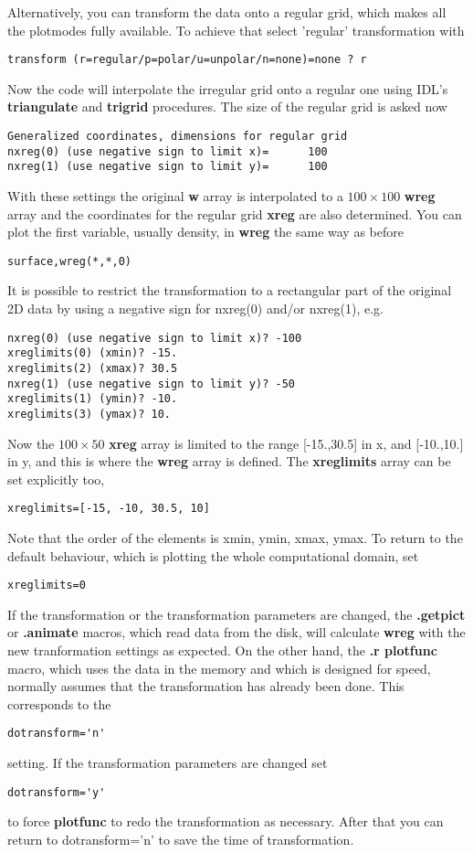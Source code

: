    Alternatively, you can transform the data onto a regular grid, 
   which makes all the plotmodes fully available. 
   To achieve that select 'regular' transformation with
\begin{verbatim}
transform (r=regular/p=polar/u=unpolar/n=none)=none ? r
\end{verbatim}
   Now the code will interpolate the irregular grid onto a 
   regular one using IDL's {\bf triangulate} and {\bf trigrid} procedures.  
   The size of the regular grid is asked now
\begin{verbatim}
Generalized coordinates, dimensions for regular grid
nxreg(0) (use negative sign to limit x)=      100
nxreg(1) (use negative sign to limit y)=      100
\end{verbatim}
   With these settings the original {\bf w} array is interpolated to 
   a $100\times100$ {\bf wreg} array and the
   coordinates for the regular grid {\bf xreg} are also determined. 
   You can plot the first variable, usually density, in {\bf wreg} the 
   same way as before
\begin{verbatim}
surface,wreg(*,*,0)
\end{verbatim}
   It is possible to restrict the transformation to a rectangular
   part of the original 2D data by using a negative sign for nxreg(0) and/or
   nxreg(1), e.g.
\begin{verbatim}
nxreg(0) (use negative sign to limit x)? -100
xreglimits(0) (xmin)? -15.
xreglimits(2) (xmax)? 30.5
nxreg(1) (use negative sign to limit y)? -50
xreglimits(1) (ymin)? -10.
xreglimits(3) (ymax)? 10.
\end{verbatim}
   Now the $100\times 50$ {\bf xreg} array is limited to the range 
   [-15.,30.5] in x, and [-10.,10.] in y, and this is where the {\bf wreg} 
   array is defined. The {\bf xreglimits} array can be set explicitly too,
\begin{verbatim}
xreglimits=[-15, -10, 30.5, 10]
\end{verbatim}
   Note that the order of the elements is xmin, ymin, xmax, ymax.
   To return to the default behaviour, which is plotting the whole 
   computational domain, set
\begin{verbatim}
xreglimits=0
\end{verbatim}
   If the transformation or the transformation parameters are changed,
   the {\bf .getpict} or {\bf .animate} macros, which read data from
   the disk, will calculate {\bf wreg} with the new tranformation settings
   as expected. On the other hand, the {\bf .r plotfunc} macro, 
   which uses the data in the memory
   and which is designed for speed, normally assumes that the transformation 
   has already been done. This corresponds to the
\begin{verbatim}
dotransform='n'
\end{verbatim}
   setting. If the transformation parameters are changed set
\begin{verbatim}
dotransform='y'
\end{verbatim}
   to force {\bf plotfunc} to redo the transformation as necessary.
   After that you can return to dotransform='n' to save the time of
   transformation.

